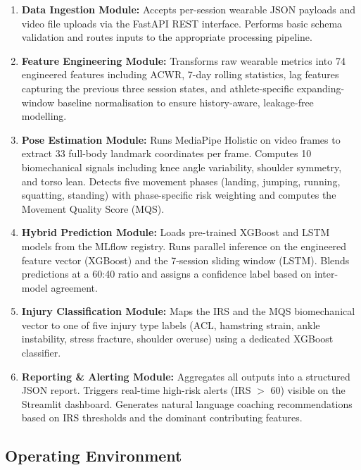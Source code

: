 \documentclass[12pt,a4paper]{report}
\begin{document}
\begin{enumerate}
  \item \textbf{Data Ingestion Module:} Accepts per-session wearable JSON payloads and video file uploads via the FastAPI REST interface. Performs basic schema validation and routes inputs to the appropriate processing pipeline.
  \item \textbf{Feature Engineering Module:} Transforms raw wearable metrics into 74 engineered features including ACWR, 7-day rolling statistics, lag features capturing the previous three session states, and athlete-specific expanding-window baseline normalisation to ensure history-aware, leakage-free modelling.
  \item \textbf{Pose Estimation Module:} Runs MediaPipe Holistic on video frames to extract 33 full-body landmark coordinates per frame. Computes 10 biomechanical signals including knee angle variability, shoulder symmetry, and torso lean. Detects five movement phases (landing, jumping, running, squatting, standing) with phase-specific risk weighting and computes the Movement Quality Score (MQS).
  \item \textbf{Hybrid Prediction Module:} Loads pre-trained XGBoost and LSTM models from the MLflow registry. Runs parallel inference on the engineered feature vector (XGBoost) and the 7-session sliding window (LSTM). Blends predictions at a 60:40 ratio and assigns a confidence label based on inter-model agreement.
  \item \textbf{Injury Classification Module:} Maps the IRS and the MQS biomechanical vector to one of five injury type labels (ACL, hamstring strain, ankle instability, stress fracture, shoulder overuse) using a dedicated XGBoost classifier.
  \item \textbf{Reporting \& Alerting Module:} Aggregates all outputs into a structured JSON report. Triggers real-time high-risk alerts (IRS $>$ 60) visible on the Streamlit dashboard. Generates natural language coaching recommendations based on IRS thresholds and the dominant contributing features.
\end{enumerate}

\subsection{Operating Environment}
\end{document}
